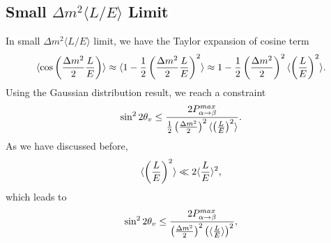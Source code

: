 \documentclass[letterpaper,12pt,english]{sphinxmanual}
\begin{document}
\subsection{Small \(\Delta m^2 \langle L/E \rangle\) Limit}
\label{experiments:small-limit}
In small \(\Delta m^2 \langle L/E \rangle\) limit, we have the Taylor expansion of cosine term
\begin{gather}
\begin{split}\langle \cos \left( \frac{\Delta m^2}{2} \frac{L}{E} \right)\rangle \approx \langle 1- \frac{1}{2}\left( \frac{\Delta m^2}{2} \frac{L}{E} \right)^2 \rangle  \approx 1 - \frac{1}{2} \left(\frac{\Delta m^2}{2} \right)^2 \langle \left( \frac{L}{E} \right)^2 \rangle.\end{split}\notag
\end{gather}
Using the Gaussian distribution result, we reach a constraint
\begin{gather}
\begin{split}\sin^2 2\theta_v \leq \frac{2 P_{\alpha\to\beta}^{max} }{\frac{1}{2} \left( \frac{\Delta m^2}{2}  \right)^2 \langle \left(\frac{L}{E}\right)^2 \rangle}.\end{split}\notag
\end{gather}
As we have discussed before,
\begin{gather}
\begin{split}\langle \left(\frac{L}{E} \right)^2 \rangle \ll 2\langle \frac{L}{E}\rangle^2,\end{split}\notag
\end{gather}
which leads to
\begin{gather}
\begin{split}\sin^2 2\theta_v \leq \frac{2 P_{\alpha\to\beta}^{max} }{ \left( \frac{\Delta m^2}{2}  \right)^2  \left(\langle\frac{L}{E} \rangle\right)^2 },\end{split}\notag
\end{gather}
\end{document}
